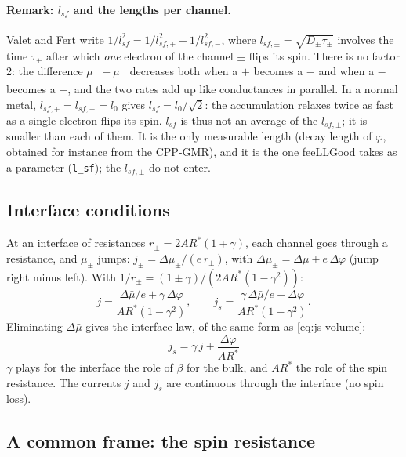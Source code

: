 \documentclass[11pt,a4paper]{article}
\begin{document}
\paragraph{Remark: $l_{sf}$ and the lengths per channel.} Valet and Fert
write $1/l_{sf}^2 = 1/l_{sf,+}^2 + 1/l_{sf,-}^2$, where
$l_{sf,\pm} = \sqrt{D_\pm\tau_\pm}$ involves the time $\tau_\pm$ after which
\emph{one} electron of the channel $\pm$ flips its spin. There is no
factor 2: the difference $\mu_+-\mu_-$ decreases both when a $+$ becomes a
$-$ and when a $-$ becomes a $+$, and the two rates add up like
conductances in parallel. In a normal metal, $l_{sf,+} = l_{sf,-} = l_0$
gives $l_{sf} = l_0/\sqrt2$: the accumulation relaxes twice as fast as a
single electron flips its spin. $l_{sf}$ is thus not an average of the
$l_{sf,\pm}$; it is smaller than each of them. It is the only measurable
length (decay length of $\varphi$, obtained for instance from the CPP-GMR),
and it is the one feeLLGood takes as a parameter (\texttt{l\_sf}); the
$l_{sf,\pm}$ do not enter.

\subsection{Interface conditions}

At an interface of resistances $r_\pm = 2AR^*(1\mp\gamma)$, each channel
goes through a resistance, and $\mu_\pm$ jumps:
$j_\pm = \Delta\mu_\pm/(e\,r_\pm)$, with $\Delta\mu_\pm = \Delta\bar\mu \pm
e\,\Delta\varphi$ (jump right minus left). With
$1/r_\pm = (1\pm\gamma)/\left(2AR^*(1-\gamma^2)\right)$:
\begin{equation}
  j = \frac{\Delta\bar\mu/e + \gamma\,\Delta\varphi}{AR^*(1-\gamma^2)},
  \qquad
  j_s = \frac{\gamma\,\Delta\bar\mu/e + \Delta\varphi}{AR^*(1-\gamma^2)} .
\end{equation}
Eliminating $\Delta\bar\mu$ gives the interface law, of the same form as
\eqref{eq:js-volume}:
\begin{equation}
  \boxed{\;j_s = \gamma\,j + \frac{\Delta\varphi}{AR^*}\;}
  \label{eq:js-interface}
\end{equation}
$\gamma$ plays for the interface the role of $\beta$ for the bulk, and
$AR^*$ the role of the spin resistance. The currents $j$ and $j_s$ are
continuous through the interface (no spin loss).

\subsection{A common frame: the spin resistance}
\end{document}
